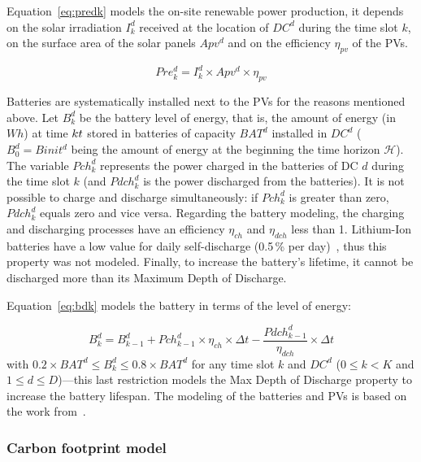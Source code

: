 Equation~\eqref{eq:predk} models the on-site renewable power production,  it depends on the solar irradiation $I^d_k$ received at the location of $DC^d$ during the time slot $k$, on the surface area of the solar panels $Apv^d$ and on the efficiency $\eta_{pv}$ of the PVs. 

\begin{equation} \label{eq:predk}
    Pre^d_{k}= I^d_k \times Apv^d \times \eta_{pv}
\end{equation}


Batteries are systematically installed next to the PVs for the reasons mentioned above. Let $B^d_k$ be the battery level of energy, that is, the amount of energy (in $Wh$) at time $k\time\Delta t$ stored in batteries of capacity $BAT^d$ installed in $DC^d$ ($B^d_0 = Binit^d$ being the amount of energy at the beginning the time horizon $\mathcal{H}$). The variable $Pch_k^d$ represents the power charged in the batteries of DC $d$ during the time slot $k$ (and $Pdch_k^d$ is the power discharged from the batteries). It is not possible to charge and discharge simultaneously: if $Pch^d_k$ is greater than zero, $Pdch^d_k$ equals zero and vice versa. Regarding the battery modeling, the charging and discharging processes have an efficiency $\eta_{ch}$ and $\eta_{dch}$ less than 1. Lithium-Ion batteries have a low value for daily self-discharge (0.5\,\% per day)~\cite{wang2012_EDCS}, thus this property was not modeled. Finally, to increase the battery's lifetime, it cannot be discharged more than its Maximum Depth of Discharge.

Equation~\eqref{eq:bdk} models the battery in terms of the level of energy:

\begin{equation} \label{eq:bdk}
  B^d_k = B^d_{k-1}  + Pch^d_{k-1} \times \eta_{ch} \times \Delta{t} - \frac{Pdch^d_{k-1}}{\eta_{dch}} \times \Delta{t}
\end{equation}
with $0.2\times BAT^d \leq B^d_k\leq 0.8\times BAT^d$ for any time slot $k$ and $DC^d$ ($0\leq k<K$ and $1\leq d\leq D$)---this last restriction models the Max Depth of Discharge property to increase the battery lifespan. The modeling of the batteries and PVs is based on the work from~\citet{2021NICOD_ILP}.


\subsubsection{Carbon footprint model} \label{sec:footprintmodel_ccgrid}


